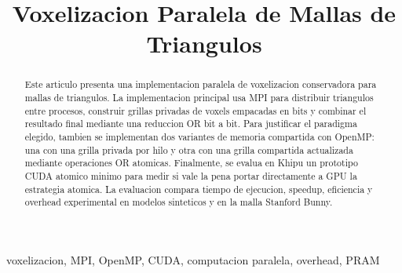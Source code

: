 \documentclass[conference]{IEEEtran}
\begin{document}
\title{Voxelizacion Paralela de Mallas de Triangulos}

\author{
    \and
    \and
}

\maketitle

\begin{abstract}
    Este articulo presenta una implementacion paralela de voxelizacion conservadora
    para mallas de triangulos. La implementacion principal usa MPI para distribuir
    triangulos entre procesos, construir grillas privadas de voxels empacadas en
    bits y combinar el resultado final mediante una reduccion OR bit a bit. Para
    justificar el paradigma elegido, tambien se implementan dos variantes de
    memoria compartida con OpenMP: una con una grilla privada por hilo y otra con
    una grilla compartida actualizada mediante operaciones OR atomicas. Finalmente,
    se evalua en Khipu un prototipo CUDA atomico minimo para medir si vale la pena
    portar directamente a GPU la estrategia atomica. La evaluacion compara tiempo
    de ejecucion, speedup, eficiencia y overhead experimental en modelos sinteticos
    y en la malla Stanford Bunny.
\end{abstract}

\begin{IEEEkeywords}
    voxelizacion, MPI, OpenMP, CUDA, computacion paralela, overhead, PRAM
\end{IEEEkeywords}
\end{document}
